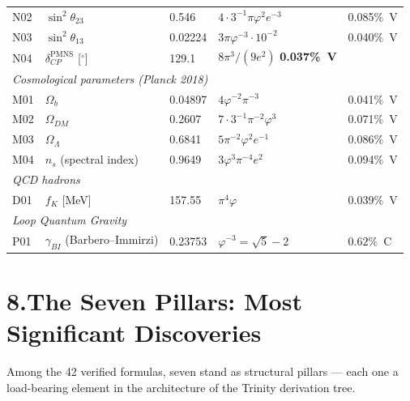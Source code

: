 \documentclass[10pt,a4paper]{article}
\begin{document}
\begin{longtable}{@{}lp{3.0cm}lp{4.5cm}l@{}}
N02 & $\sin^2\theta_{23}$ & 0.546 & $4{\cdot}3^{-1}\pi\varphi^2 e^{-3}$ & 0.085\%~V \\
N03 & $\sin^2\theta_{13}$ & 0.02224 & $3\pi\varphi^{-3} \cdot 10^{-2}$ & 0.040\%~V \\
N04 & $\delta_{CP}^{\mathrm{PMNS}}$ [$^\circ$] & 129.1 & $8\pi^3/(9e^2)$ \textbf{0.037\%~V} \\
\midrule
\multicolumn{5}{l}{\textit{Cosmological parameters (Planck 2018)}}\\
M01 & $\Omega_b$ & 0.04897 & $4\varphi^{-2}\pi^{-3}$ & 0.041\%~V \\
M02 & $\Omega_{DM}$ & 0.2607 & $7{\cdot}3^{-1}\pi^{-2}\varphi^3$ & 0.071\%~V \\
M03 & $\Omega_\Lambda$ & 0.6841 & $5\pi^{-2}\varphi^2 e^{-1}$ & 0.086\%~V \\
M04 & $n_s$ (spectral index) & 0.9649 & $3\varphi^3\pi^{-4}e^2$ & 0.094\%~V \\
\midrule
\multicolumn{5}{l}{\textit{QCD hadrons}}\\
D01 & $f_K$ [MeV] & 157.55 & $\pi^4\varphi$ & 0.039\%~V \\
\midrule
\multicolumn{5}{l}{\textit{Loop Quantum Gravity}}\\
P01 & $\gamma_{BI}$ (Barbero--Immirzi) & 0.23753 & $\varphi^{-3} = \sqrt{5}-2$ & $0.62\%$~C \\
\end{longtable}

\section*{8.\quad The Seven Pillars: Most Significant Discoveries}

Among the 42 verified formulas, seven stand as structural pillars ---
each one a load-bearing element in the architecture of the Trinity derivation tree.
\end{document}
